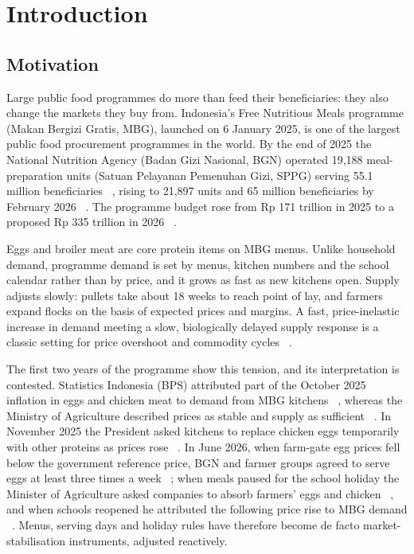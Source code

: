 \documentclass[10pt,twocolumn,a4paper]{article}
\begin{document}
\section{Introduction}\label{sec:intro}

\subsection{Motivation}

Large public food programmes do more than feed their beneficiaries: they also change the markets they buy from. Indonesia's Free Nutritious Meals programme (Makan Bergizi Gratis, MBG), launched on 6 January 2025, is one of the largest public food procurement programmes in the world. By the end of 2025 the National Nutrition Agency (Badan Gizi Nasional, BGN) operated 19,188 meal-preparation units (Satuan Pelayanan Pemenuhan Gizi, SPPG) serving 55.1 million beneficiaries ~\cite{bgn2025}, rising to 21,897 units and 65 million beneficiaries by February 2026 ~\cite{antara2026}. The programme budget rose from Rp 171 trillion in 2025 to a proposed Rp 335 trillion in 2026 ~\cite{budget}.


Eggs and broiler meat are core protein items on MBG menus. Unlike household demand, programme demand is set by menus, kitchen numbers and the school calendar rather than by price, and it grows as fast as new kitchens open. Supply adjusts slowly: pullets take about 18 weeks to reach point of lay, and farmers expand flocks on the basis of expected prices and margins. A fast, price-inelastic increase in demand meeting a slow, biologically delayed supply response is a classic setting for price overshoot and commodity cycles ~\cite{meadows1970,sterman2000}.


The first two years of the programme show this tension, and its interpretation is contested. Statistics Indonesia (BPS) attributed part of the October 2025 inflation in eggs and chicken meat to demand from MBG kitchens ~\cite{bps2025}, whereas the Ministry of Agriculture described prices as stable and supply as sufficient ~\cite{kementan2025}. In November 2025 the President asked kitchens to replace chicken eggs temporarily with other proteins as prices rose ~\cite{prabowo2025}. In June 2026, when farm-gate egg prices fell below the government reference price, BGN and farmer groups agreed to serve eggs at least three times a week ~\cite{egg3x2026}; when meals paused for the school holiday the Minister of Agriculture asked companies to absorb farmers' eggs and chicken ~\cite{amran2026}, and when schools reopened he attributed the following price rise to MBG demand ~\cite{okezone2026}. Menus, serving days and holiday rules have therefore become de facto market-stabilisation instruments, adjusted reactively.
\end{document}
